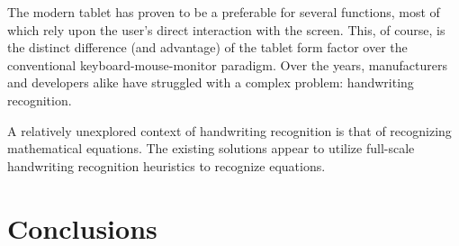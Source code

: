 \documentclass{acm_proc_article-sp}
\begin{document}
The modern tablet has proven to be a preferable for several functions, most of which rely upon the user's direct interaction with the screen. This, of course, is the distinct difference (and advantage) of the tablet form factor over the conventional keyboard-mouse-monitor paradigm. Over the years, manufacturers and developers alike have struggled with a complex problem: handwriting recognition.

A relatively unexplored context of handwriting recognition is that of recognizing mathematical equations. The existing solutions appear to utilize full-scale handwriting recognition heuristics to recognize equations. 

\section{Conclusions}


%

%
%


\balancecolumns

\end{document}

